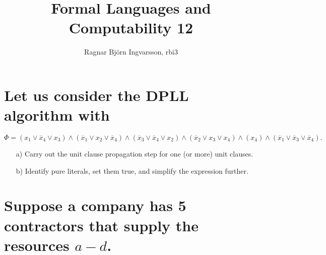\documentclass{article}
\title{Formal Languages and Computability 12}
\author{Ragnar Björn Ingvarsson, rbi3}
\begin{document}
\renewcommand\thepage{}

	\maketitle

	\newpage
	\setcounter{page}{1}
	\renewcommand\thepage{\arabic{page}}

	\section{Let us consider the DPLL algorithm with}
	\[
			\Phi = (x_1\vee \overline{x}_4\vee x_3)\wedge
			(\overline{x}_1\vee x_2\vee\overline{x}_4)\wedge
			(\overline{x}_3\vee \overline{x}_4\vee x_2)\wedge
			(\overline{x}_2\vee x_3\vee x_4)\wedge
			(x_4)\wedge
			(\overline{x}_1\vee \overline{x}_3\vee\overline{x}_4).
	\]

	\begin{itemize}
		\item[a)] Carry out the unit clause propagation step for one (or 
			more) unit clauses.
		\item[b)] Identify pure literals, set them true, and simplify the 
			expression further.
	\end{itemize}

	\section{Suppose a company has 5 contractors that supply the resources 
	$a - d$.}
\end{document}
